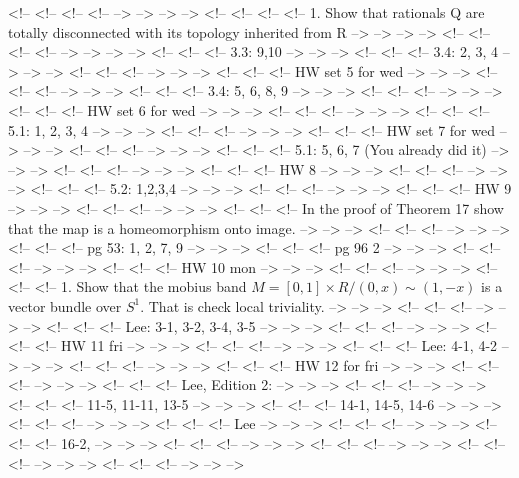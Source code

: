 \documentclass{amsart}
\numberwithin{equation}{section}
\theoremstyle{definition}
\theoremstyle{remark}
\begin{document}
<!-- <!-- <!-- <!--  --> --> --> -->
<!-- <!-- <!-- <!-- 1. Show that rationals Q are totally disconnected with its topology inherited from R --> --> --> -->
<!-- <!-- <!-- <!--  --> --> --> -->
<!-- <!-- <!-- 3.3: 9,10   --> --> -->
<!-- <!-- <!-- 3.4: 2, 3, 4 --> --> -->
<!-- <!-- <!--  --> --> -->
<!-- <!-- <!-- HW set 5 for wed --> --> -->
<!-- <!-- <!--  --> --> -->
<!-- <!-- <!-- 3.4: 5, 6, 8, 9 --> --> -->
<!-- <!-- <!--  --> --> -->
<!-- <!-- <!-- HW set 6 for wed --> --> -->
<!-- <!-- <!--  --> --> -->
<!-- <!-- <!-- 5.1: 1, 2, 3, 4 --> --> -->
<!-- <!-- <!--  --> --> -->
<!-- <!-- <!-- HW set 7 for wed --> --> -->
<!-- <!-- <!--  --> --> -->
<!-- <!-- <!-- 5.1: 5, 6, 7   (You already did it) --> --> -->
<!-- <!-- <!--  --> --> -->
<!-- <!-- <!-- HW 8 --> --> -->
<!-- <!-- <!--  --> --> -->
<!-- <!-- <!-- 5.2: 1,2,3,4   --> --> -->
<!-- <!-- <!--  --> --> -->
<!-- <!-- <!-- HW 9 --> --> -->
<!-- <!-- <!--  --> --> -->
<!-- <!-- <!-- In the proof of Theorem 17 show that the map is a homeomorphism onto image. --> --> -->
<!-- <!-- <!--  --> --> -->
<!-- <!-- <!-- pg 53: 1, 2, 7, 9   --> --> -->
<!-- <!-- <!-- pg 96 2   --> --> -->
<!-- <!-- <!--  --> --> -->
<!-- <!-- <!-- HW 10 mon --> --> -->
<!-- <!-- <!--  --> --> -->
<!-- <!-- <!-- 1. Show that the mobius band $M=[0,1] \times R /(0,x) \sim (1,-x)$ is a vector bundle over $S^1$. That is check local triviality.   --> --> -->
<!-- <!-- <!--  --> --> -->
<!-- <!-- <!-- Lee: 3-1, 3-2, 3-4, 3-5   --> --> -->
<!-- <!-- <!--  --> --> -->
<!-- <!-- <!-- HW 11 fri --> --> -->
<!-- <!-- <!--  --> --> -->
<!-- <!-- <!-- Lee: 4-1, 4-2   --> --> -->
<!-- <!-- <!--  --> --> -->
<!-- <!-- <!-- HW 12 for fri --> --> -->
<!-- <!-- <!--  --> --> -->
<!-- <!-- <!-- Lee, Edition 2: --> --> -->
<!-- <!-- <!--  --> --> -->
<!-- <!-- <!-- 11-5,  11-11, 13-5   --> --> -->
<!-- <!-- <!-- 14-1, 14-5, 14-6   --> --> -->
<!-- <!-- <!--  --> --> -->
<!-- <!-- <!-- Lee --> --> -->
<!-- <!-- <!--  --> --> -->
<!-- <!-- <!-- 16-2,  --> --> -->
<!-- <!-- <!--  --> --> -->
<!-- <!-- <!--  --> --> -->
<!-- <!-- <!--  --> --> -->
<!-- <!-- <!--  --> --> -->


\end{document}
